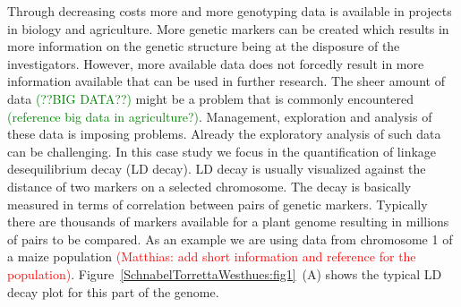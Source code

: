 \documentclass[twoside]{report}
\begin{document}
Through decreasing costs more and more genotyping data is available in projects in 
biology and agriculture. More genetic markers can be created which results in more 
information on the genetic structure being at the disposure of the investigators. However, 
more available data does not forcedly result in more information available that can be 
used in further research. The sheer amount of data \textcolor{green}{(??BIG DATA??)} 
might be a problem 
that is commonly encountered \textcolor{green}{(reference big data in agriculture?)}. 
Management, exploration and 
analysis of these data is imposing problems. Already the exploratory analysis of such data 
can be challenging. In this case study we focus in the quantification of linkage desequilibrium 
decay (LD decay). LD decay is usually visualized against the distance of two markers 
on a selected chromosome. The decay is basically measured in terms of correlation between 
pairs of genetic markers. Typically there are thousands of markers available for a plant 
genome resulting in millions of pairs to be compared. 
As an example we are using data from chromosome 1 of a maize population 
\textcolor{red}{(Matthias: add short 
information and reference for the population)}. 
Figure~\ref{SchnabelTorrettaWesthues:fig1}~(A) shows the typical LD decay plot 
for this part of the genome. 

\end{document}
